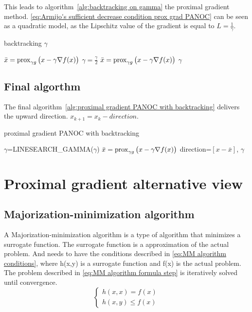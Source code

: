 			This leads to algorithm~\ref{alg:backtracking on gamma} the proximal gradient method. \eqref{eq:Armijo's sufficient decrease condition prox grad PANOC} can be seen as a quadratic model, as the Lipschitz value of the gradient is equal to $L=\frac{1}{\gamma}$.
			
			\begin{algorithm}
				\caption{backtracking $\gamma$}
				\label{alg:backtracking on gamma}
				\begin{algorithmic}[1]
					\State $\bar{x} = \operatorname{prox}_{\gamma g}\big( x- \gamma \nabla f(x)\big)$
					\State $\gamma = \frac{\gamma}{2}$
					\State $\bar{x} = \operatorname{prox}_{\gamma g}\big( x- \gamma \nabla f(x)\big)$
					\EndWhile
					\State \Return $\gamma$
					\EndProcedure
				\end{algorithmic}
			\end{algorithm}
	\subsection{Final algorthm}
		The final algorithm~\ref{alg:proximal gradient PANOC with backtracking} delivers the upward direction. $x_{k+1}=x_k - direction$.
		\begin{algorithm}
			\caption{proximal gradient PANOC with backtracking}
			\label{alg:proximal gradient PANOC with backtracking}
			\begin{algorithmic}[1]
				\Procedure{get\_proximal\_gradient\_step}{x,$\gamma$}
				\State $\gamma$=LINESEARCH\_GAMMA($\gamma$)
				\State $\bar{x} = \operatorname{prox}_{\gamma g}\big( x- \gamma \nabla f(x)\big)$
				\State \Return direction=$[x-\bar{x}]$, $\gamma$
				\EndProcedure
			\end{algorithmic}
		\end{algorithm}
\section{Proximal gradient alternative view}
	\subsection{Majorization-minimization algorithm}
	A Majorization-minimization algorithm is a type of algorithm that minimizes a surrogate function. The surrogate function is a approximation of the actual problem. And needs to have the conditions described in \eqref{eq:MM algorithm conditions}, where h(x,y) is a surrogate function and f(x) is the actual problem. The problem described in \eqref{eq:MM algorithm formula step} is iteratively solved until convergence.
	\begin{equation}
		\begin{cases}
			h(x,x) = f(x) \\
			h(x,y) \leq f(x)
		\end{cases}
		\label{eq:MM algorithm conditions}
	\end{equation}
	
